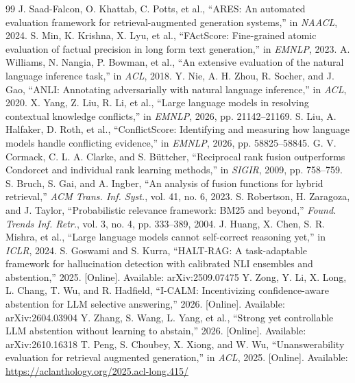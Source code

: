 \documentclass[conference]{IEEEtran}
\begin{document}
\begin{thebibliography}{99}
 J. Saad-Falcon, O. Khattab, C. Potts, et al., ``ARES: An automated evaluation framework for retrieval-augmented generation systems,'' in \emph{NAACL}, 2024.
 S. Min, K. Krishna, X. Lyu, et al., ``FActScore: Fine-grained atomic evaluation of factual precision in long form text generation,'' in \emph{EMNLP}, 2023.
 A. Williams, N. Nangia, P. Bowman, et al., ``An extensive evaluation of the natural language inference task,'' in \emph{ACL}, 2018.
 Y. Nie, A. H. Zhou, R. Socher, and J. Gao, ``ANLI: Annotating adversarially with natural language inference,'' in \emph{ACL}, 2020.
 X. Yang, Z. Liu, R. Li, et al., ``Large language models in resolving contextual knowledge conflicts,'' in \emph{EMNLP}, 2026, pp. 21142--21169.
 S. Liu, A. Halfaker, D. Roth, et al., ``ConflictScore: Identifying and measuring how language models handle conflicting evidence,'' in \emph{EMNLP}, 2026, pp. 58825--58845.
 G. V. Cormack, C. L. A. Clarke, and S. B\"uttcher, ``Reciprocal rank fusion outperforms Condorcet and individual rank learning methods,'' in \emph{SIGIR}, 2009, pp. 758--759.
 S. Bruch, S. Gai, and A. Ingber, ``An analysis of fusion functions for hybrid retrieval,'' \emph{ACM Trans. Inf. Syst.}, vol. 41, no. 6, 2023.
 S. Robertson, H. Zaragoza, and J. Taylor, ``Probabilistic relevance framework: BM25 and beyond,'' \emph{Found. Trends Inf. Retr.}, vol. 3, no. 4, pp. 333--389, 2004.
 J. Huang, X. Chen, S. R. Mishra, et al., ``Large language models cannot self-correct reasoning yet,'' in \emph{ICLR}, 2024.
 S. Goswami and S. Kurra, ``HALT-RAG: A task-adaptable framework for hallucination detection with calibrated NLI ensembles and abstention,'' 2025. [Online]. Available: arXiv:2509.07475
 Y. Zong, Y. Li, X. Long, L. Chang, T. Wu, and R. Hadfield, ``I-CALM: Incentivizing confidence-aware abstention for LLM selective answering,'' 2026. [Online]. Available: arXiv:2604.03904
 Y. Zhang, S. Wang, L. Yang, et al., ``Strong yet controllable LLM abstention without learning to abstain,'' 2026. [Online]. Available: arXiv:2610.16318
 T. Peng, S. Choubey, X. Xiong, and W. Wu, ``Unanswerability evaluation for retrieval augmented generation,'' in \emph{ACL}, 2025. [Online]. Available: \url{https://aclanthology.org/2025.acl-long.415/}

\end{thebibliography}
\end{document}
